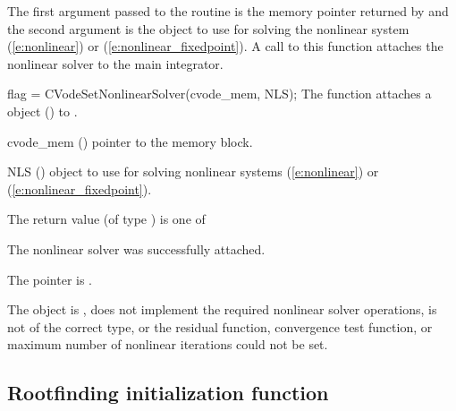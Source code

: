 The first argument passed to the routine  is the
{\cvode} memory pointer returned by  and the second argument is
the {\sunnonlinsol} object to use for solving the nonlinear system
(\ref{e:nonlinear}) or (\ref{e:nonlinear_fixedpoint}).
A call to this function attaches the nonlinear solver to the main {\cvode}
integrator.

{
  flag = CVodeSetNonlinearSolver(cvode\_mem, NLS);
}
{
  The function  attaches a {\sunnonlinsol}
  object () to {\cvode}.
}
{
  \begin{args}
  \item[cvode\_mem] ()
    pointer to the {\cvode} memory block.
  \item[NLS] ()
    {\sunnonlinsol} object to use for solving nonlinear systems
    (\ref{e:nonlinear}) or (\ref{e:nonlinear_fixedpoint}).
  \end{args}
}
{
  The return value  (of type ) is one of
  \begin{args}
  \item[\Id{CV\_SUCCESS}]
    The nonlinear solver was successfully attached.
  \item[\Id{CV\_MEM\_NULL}]
    The  pointer is .
  \item[\Id{CV\_ILL\_INPUT}]
    The {\sunnonlinsol} object is , does not implement the required
    nonlinear solver operations, is not of the correct type, or the residual
    function, convergence test function, or maximum number of nonlinear
    iterations could not be set.
  \end{args}
}
{}

\subsection{Rootfinding initialization function}\label{ss:cvrootinit}

